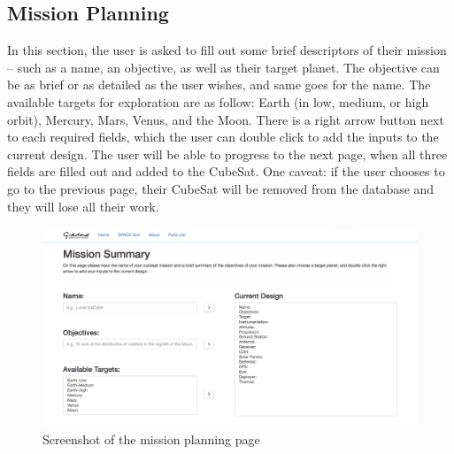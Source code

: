 \documentclass[a4, 12 pt]{article} %
\begin{document}
\subsection{Mission Planning}
In this section, the user is asked to fill out some brief descriptors of their mission -- such as a name, an objective, as well as their target planet. The objective can be as brief or as detailed as the user wishes, and same goes for the name. The available targets for exploration are as follow: Earth (in low, medium, or high orbit), Mercury, Mars, Venus, and the Moon. There is a right arrow button next to each required fields, which the user can double click to add the inputs to the current design. The user will be able to progress to the next page, when all three fields are filled out and added to the CubeSat. One caveat: if the user chooses to go to the previous page, their CubeSat will be removed from the database and they will lose all their work. 
\begin{figure}[H]
\begin{center}
\includegraphics[width=\linewidth]{1}
\caption{Screenshot of the mission planning page}
\label{default}
\end{center}
\end{figure}
\end{document}
